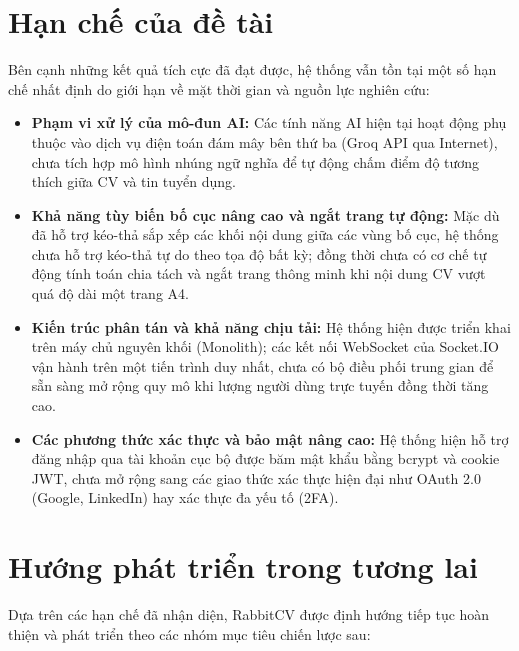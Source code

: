 \section{Hạn chế của đề tài}

Bên cạnh những kết quả tích cực đã đạt được, hệ thống vẫn tồn tại một số hạn chế nhất định do giới hạn về mặt thời gian và nguồn lực nghiên cứu:

\begin{itemize}
    \item \textbf{Phạm vi xử lý của mô-đun AI:} Các tính năng AI hiện tại hoạt động phụ thuộc vào dịch vụ điện toán đám mây bên thứ ba (Groq API qua Internet), chưa tích hợp mô hình nhúng ngữ nghĩa để tự động chấm điểm độ tương thích giữa CV và tin tuyển dụng.
    
    \item \textbf{Khả năng tùy biến bố cục nâng cao và ngắt trang tự động:} Mặc dù đã hỗ trợ kéo-thả sắp xếp các khối nội dung giữa các vùng bố cục, hệ thống chưa hỗ trợ kéo-thả tự do theo tọa độ bất kỳ; đồng thời chưa có cơ chế tự động tính toán chia tách và ngắt trang thông minh khi nội dung CV vượt quá độ dài một trang A4.

    \item \textbf{Kiến trúc phân tán và khả năng chịu tải:} Hệ thống hiện được triển khai trên máy chủ nguyên khối (Monolith); các kết nối WebSocket của Socket.IO vận hành trên một tiến trình duy nhất, chưa có bộ điều phối trung gian để sẵn sàng mở rộng quy mô khi lượng người dùng trực tuyến đồng thời tăng cao.

    \item \textbf{Các phương thức xác thực và bảo mật nâng cao:} Hệ thống hiện hỗ trợ đăng nhập qua tài khoản cục bộ được băm mật khẩu bằng bcrypt và cookie JWT, chưa mở rộng sang các giao thức xác thực hiện đại như OAuth 2.0 (Google, LinkedIn) hay xác thực đa yếu tố (2FA).
\end{itemize}

\section{Hướng phát triển trong tương lai}

Dựa trên các hạn chế đã nhận diện, RabbitCV được định hướng tiếp tục hoàn thiện và phát triển theo các nhóm mục tiêu chiến lược sau:

